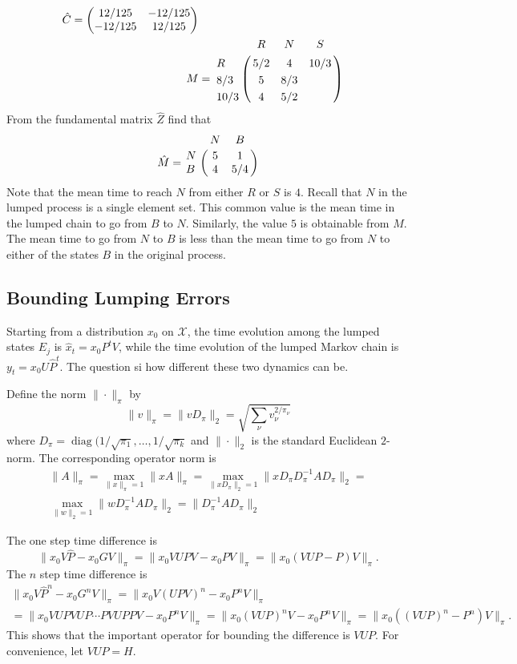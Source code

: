 \documentclass[12pt]{article}
\begin{document}
\begin{example}
\begin{example}
\begin{align*}
    \hat{C} =
    \begin{pmatrix}
      12/125  & -12/125 \\
    -12/125   &  12/125
  \end{pmatrix} \\
    M &= \bordermatrix{
        & R & N & S \cr
    R & 5/2 & 4 & 10/3 \cr
    8/3 & 5 & 8/3 \cr
    10/3 & 4 & 5/2          
               }
  \end{align*}
  From the fundamental matrix \( \hat{Z} \) find that
  \[
    \hat{M} = \bordermatrix{
      & N & B \cr
      N & 5 & 1 \cr
      B & 4 & 5/4
    }
  \]
Note that the mean time to reach \( N \) from either \( R \) or \( S
\) is \( 4 \).  Recall that \( N \) in the lumped process is a single
element set.  This common value is the mean time in the lumped chain
to go from $B$ to $N$.  Similarly, the value \( 5 \) is obtainable
from \( M \).  The mean time to go from $N$ to $B$ is less than the
mean time to go from $N$ to either of the states $B$ in the original
process.
\end{example}

\subsection*{Bounding Lumping Errors}

Starting from a distribution $x_0$ on $\mathcal{X}$, the time
evolution among the lumped states $E_j$ is $\hat{x}_{t} = x_0 P^t V$,
while the time evolution of the lumped Markov chain is $y_t = x_0U
\hat{P}^t$.  The question si how different these two dynamics can be.

Define the norm $\| \cdot \|_{\pi}$ by
\[
  \| v\|_{\pi} = \| v D_{\pi} \|_2 = \sqrt{\sum_{\nu}
    v_{\nu}^{2/\pi_\nu}}
\]
where $D_{\pi} = \operatorname{diag}(1/\sqrt{\pi_1}, \dots,
1/\sqrt{\pi_k}$ and $\| \cdot \|_2$ is the standard Euclidean
$2$-norm.  The corresponding operator norm is
\begin{multline*}
  \| A \|_{\pi} = \max_{\|x\|_{\pi}=1}\|xA\|_{\pi} =
  \max_{\|xD_{\pi}\|_2 = 1}\|x D_{\pi} D_{\pi}^{-1} A D_{\pi}\|_{2} = \\
  \max_{\|w\|_2 = 1}\|w D_{\pi}^{-1} A D_{\pi}\|_{2} =
  \| D_{\pi}^{-1} A D_{\pi}\|_{2}
\end{multline*}

The one step time difference is
\[
  \| x_0 V \hat{P} - x_0 G V \|_{\pi} = \| x_0 V U P V - x_0 P V
  \|_{\pi} = \| x_0 (VUP - P) V \|_{\pi}.
\]
The $n$ step time difference is
\begin{multline*}
  \| x_0 V \hat{P}^n - x_0 G^n V \|_{\pi} = \| x_0 V (U P V)^n - x_0 P^n V
  \|_{\pi} \\
  = \| x_0 VUPVUP \cdots PVUPPV  - x_0 P^n V \|_{\pi} = \| x_0
  (VUP)^nV - x_0 P^n V \|_{\pi} = \| x_0 ((VUP)^n - P^n) V \|_{\pi}.
\end{multline*}
This shows that the important operator for bounding the difference is $VUP$.
For convenience, let $VUP = H$.


\end{example}
\end{document}
